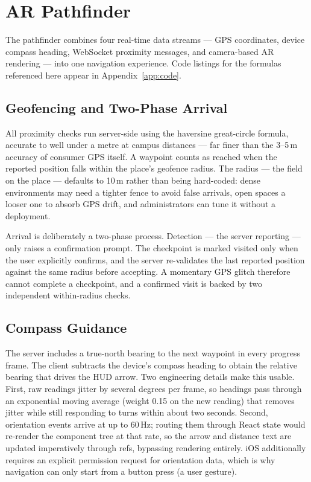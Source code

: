 \chapter{AR Pathfinder}
\label{ch:ar-pathfinder}

The pathfinder combines four real-time data streams --- GPS coordinates,
device compass heading, WebSocket proximity messages, and camera-based AR
rendering --- into one navigation experience. Code listings for the formulas
referenced here appear in Appendix~\ref{app:code}.

\section{Geofencing and Two-Phase Arrival}
All proximity checks run server-side using the haversine great-circle
formula, accurate to well under a metre at campus distances --- far finer
than the 3--5\,m accuracy of consumer GPS itself. A waypoint counts as
reached when the reported position falls within the place's geofence
radius. The radius --- the  field on the
place --- defaults to 10\,m rather than being hard-coded: dense
environments may need a
tighter fence to avoid false arrivals, open spaces a looser one to absorb
GPS drift, and administrators can tune it without a deployment.

Arrival is deliberately a two-phase process. Detection --- the server
reporting  --- only raises a confirmation prompt.
The checkpoint is marked visited only when the user explicitly confirms,
and the server re-validates the last reported position against the same
radius before accepting. A momentary GPS glitch therefore cannot complete a
checkpoint, and a confirmed visit is backed by two independent
within-radius checks.

\section{Compass Guidance}
The server includes a true-north bearing to the next waypoint in every
progress frame. The client subtracts the device's compass heading to obtain
the relative bearing that drives the HUD arrow. Two engineering details
make this usable. First, raw  readings jitter
by several degrees per frame, so headings pass through an exponential
moving average (weight 0.15 on the new reading) that removes jitter while
still responding to turns within about two seconds. Second, orientation
events arrive at up to 60\,Hz; routing them through React state would
re-render the component tree at that rate, so the arrow and distance text
are updated imperatively through refs, bypassing rendering entirely. iOS
additionally requires an explicit permission request for orientation data,
which is why navigation can only start from a button press (a user
gesture).

